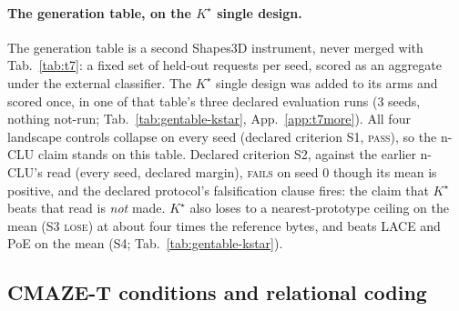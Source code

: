 \documentclass{article} %
\newcommand{\Kstar}{\ensuremath{K^{\star}}}
\begin{document}
\paragraph{The generation table, on the $\Kstar$ single design.}
The generation table is a second Shapes3D instrument, never merged with Tab.~\ref{tab:t7}: a fixed set of %
held-out requests per seed, scored as an aggregate under the external classifier. The $\Kstar$ single design was added
to its arms and scored once, in one of that table's three declared evaluation runs (3 seeds,
nothing not-run; Tab.~\ref{tab:gentable-kstar}, %
App.~\ref{app:t7more}). All four landscape controls collapse on every seed (declared criterion S1, %
\textsc{pass}), so the n-CLU claim stands on this table. Declared criterion S2, against the earlier
n-CLU's read (every seed, declared margin), \textsc{fails} on seed 0 though its mean is positive, and the %
declared protocol's falsification clause fires: the claim that $\Kstar$ beats that read is
\emph{not} made. $\Kstar$ also loses to a nearest-prototype ceiling on the mean %
(S3 \textsc{lose}) at about four times the reference bytes, and beats LACE %
and PoE on the mean (S4; Tab.~\ref{tab:gentable-kstar}). %

\subsection{CMAZE-T conditions and relational coding}
\label{sec:maze-wm}

\end{document}
